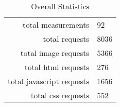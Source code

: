 \begin{table}[h]
\caption{Overall Statistics}\centering
\begin{tabular}{rl}
total measurements & 92\\
total requests & 8036\\
total image requests & 5366\\
total html requests & 276\\
total javascript requests & 1656\\
total css requests & 552\\
\end{tabular}
\end{table}
